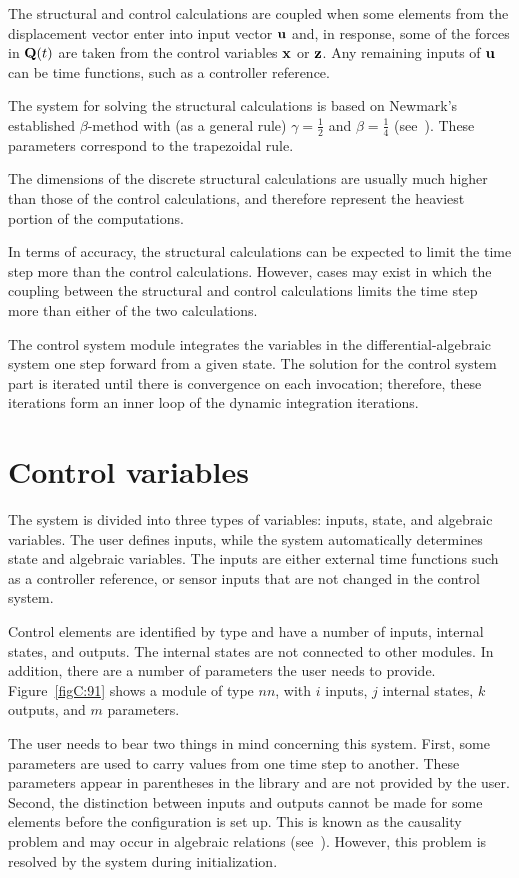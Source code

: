 The structural and control calculations are coupled when some elements from the
displacement vector enter into input vector ${\bf u}$ and, in response, some of
the forces in ${\bf Q}(t)$ are taken from the control variables $\bf x$
or $\bf z$.
Any remaining inputs of $\bf u$ can be time functions,
such as a controller reference.

The system for solving the structural calculations is based on Newmark's
established $\beta$-method with (as a general rule) $\gamma=\frac{1}{2}$ and
$\beta=\frac{1}{4}$ (see~\cite{Newmark}).
These parameters correspond to the trapezoidal rule.

The dimensions of the discrete structural calculations are usually much higher
than those of the control calculations, and therefore represent the heaviest
portion of the computations.

In terms of accuracy, the structural calculations can be expected to limit the
time step more than the control calculations.
However, cases may exist in which the coupling between the structural and
control calculations limits the time step more than either of the two calculations.

The control system module integrates the variables in the
differential-algebraic system one step forward from a given state.
The solution for the control system part is iterated until there is convergence
on each invocation; therefore, these iterations form an inner loop of the
dynamic integration iterations.

\section{Control variables}

The system is divided into three types of variables: inputs, state,
and algebraic variables.
The user defines inputs, while the system automatically determines state
and algebraic variables.
The inputs are either external time functions such as a controller reference,
or sensor inputs that are not changed in the control system.

Control elements are identified by type and have a number of inputs,
internal states, and outputs.
The internal states are not connected to other modules.
In addition, there are a number of parameters the user needs to provide.
Figure~\ref{figC:91} shows a module of type $nn$, with $i$ inputs, $j$
internal states, $k$ outputs, and $m$ parameters.

The user needs to bear two things in mind concerning this system.
First, some parameters are used to carry values from one time step to another.
These parameters appear in parentheses in the library and are not provided by the user.
Second, the distinction between inputs and outputs cannot be made for some
elements before the configuration is set up.
This is known as the causality problem and may occur in algebraic relations
(see~\cite{Iversen:STF48}).
However, this problem is resolved by the system during initialization.

